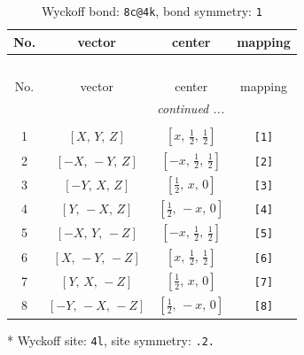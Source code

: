 \documentclass[fleqn,8pt]{jsarticle}
\begin{document}
\renewcommand{\arraystretch}{1.2}
\begin{longtable}{cccc}
\caption{Wyckoff bond: {\tt 8c@4k}, bond symmetry: {\tt 1}}
 \\
 \hline \hline
No. & vector & center & mapping \\ \hline \endfirsthead

\multicolumn{3}{l}{\tablename\ \thetable{}} \\
 \hline \hline
No. & vector & center & mapping \\ \hline \endhead

 \hline \hline
\multicolumn{3}{r}{\footnotesize\it continued ...} \\ \endfoot

 \hline \hline
\multicolumn{3}{r}{} \\ \endlastfoot

1 & $\left[ X,\, Y,\, Z \right]$ & $\left[ x,\, \frac{1}{2},\, \frac{1}{2} \right]$ & {\tt [1]} \\ \hline
2 & $\left[ - X,\, - Y,\, Z \right]$ & $\left[ - x,\, \frac{1}{2},\, \frac{1}{2} \right]$ & {\tt [2]} \\ \hline
3 & $\left[ - Y,\, X,\, Z \right]$ & $\left[ \frac{1}{2},\, x,\, 0 \right]$ & {\tt [3]} \\ \hline
4 & $\left[ Y,\, - X,\, Z \right]$ & $\left[ \frac{1}{2},\, - x,\, 0 \right]$ & {\tt [4]} \\ \hline
5 & $\left[ - X,\, Y,\, - Z \right]$ & $\left[ - x,\, \frac{1}{2},\, \frac{1}{2} \right]$ & {\tt [5]} \\ \hline
6 & $\left[ X,\, - Y,\, - Z \right]$ & $\left[ x,\, \frac{1}{2},\, \frac{1}{2} \right]$ & {\tt [6]} \\ \hline
7 & $\left[ Y,\, X,\, - Z \right]$ & $\left[ \frac{1}{2},\, x,\, 0 \right]$ & {\tt [7]} \\ \hline
8 & $\left[ - Y,\, - X,\, - Z \right]$ & $\left[ \frac{1}{2},\, - x,\, 0 \right]$ & {\tt [8]} \\
\end{longtable}
* Wyckoff site: {\tt 4l}, site symmetry: {\tt .2.}
\renewcommand{\arraystretch}{1.2}
\end{document}
